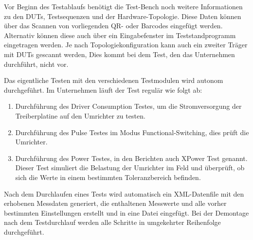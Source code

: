 Vor Beginn des Testablaufs benötigt die Test-Bench noch weitere Informationen zu den \ac{DUTs}, Testsequenzen und der Hardware-Topologie.
Diese Daten können über das Scannen von vorliegenden QR- oder Barcodes eingefügt werden.
Alternativ können diese auch über ein Eingabefenster im Teststandprogramm eingetragen werden.
Je nach Topologiekonfiguration kann auch ein zweiter Träger mit \ac{DUTs} gescannt werden,
Dies kommt bei dem Test, den das Unternehmen durchführt, nicht vor. \cite*{Main_Manuel_USTB2018}

Das eigentliche Testen mit den verschiedenen Testmodulen wird autonom durchgeführt.
Im Unternehmen läuft der Test regulär wie folgt ab:
\begin{enumerate}

\item Durchführung des Driver Consumption Testes, um die Stromversorgung der Treiberplatine auf den Umrichter zu testen.
\item Durchführung des Pulse Testes im Modus Functional-Switching, dies prüft die Umrichter.
\item Durchführung des Power Testes, in den Berichten auch XPower Test genannt.
Dieser Test simuliert die Belastung der Umrichter im Feld und überprüft,
ob sich die Werte in einem bestimmten Toleranzbereich befinden.

\end{enumerate}

Nach dem Durchlaufen eines Tests wird automatisch ein \ac{XML}-Datenfile mit den erhobenen Messdaten generiert,
die enthaltenen Messwerte und alle vorher bestimmten Einstellungen erstellt und in eine Datei eingefügt.
Bei der Demontage nach dem Testdurchlauf werden alle Schritte in umgekehrter Reihenfolge durchgeführt.




